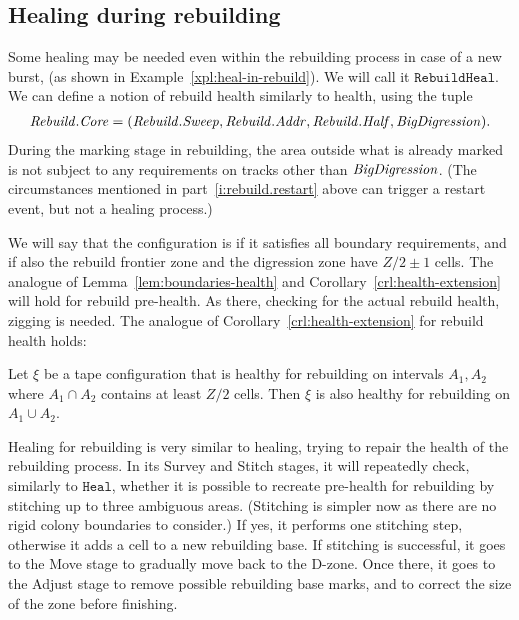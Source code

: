 \documentclass[11pt]{memoir}
\theoremstyle{definition} %
\newcommand{\fld}[1]{\ensuremath{\textit{#1\/}}}
\newcommand{\rul}[1]{\ensuremath{\texttt{#1}}}
\newcommand{\Z}{Z} %
\newcommand{\Addr}{\fld{Addr}}
\newcommand{\BigDigression}{\fld{BigDigression}}
\newcommand{\Core}{\fld{Core}}
\newcommand{\Half}{\fld{Half}} %
\newcommand{\Rebuild}{\fld{Rebuild}} %
\newcommand{\Sweep}{\fld{Sweep}} %
\newcommand{\rHeal}{\rul{Heal}}
\newcommand{\rRebuildHeal}{\rul{RebuildHeal}}
\begin{document}
\subsection{Healing during rebuilding}\label{sec:rebuild-heal}

Some healing may be needed even within the rebuilding process in case of a new burst,
(as shown in Example~\ref{xpl:heal-in-rebuild}).
We will call it \( \rRebuildHeal \).
We can define a notion of rebuild health similarly to health, using the tuple
\begin{align*}
 \Rebuild.\Core = (\Rebuild.\Sweep, \Rebuild.\Addr, \Rebuild.\Half,\BigDigression).
\end{align*}
During the marking stage in rebuilding, the area outside what is already marked is not subject
to any requirements on tracks other than \( \BigDigression \).
(The circumstances mentioned in part~\ref{i:rebuild.restart} above can trigger a restart event, but not
a healing process.)

We will say that the configuration is  if it
satisfies all boundary requirements, and 
if also the rebuild frontier zone and the digression zone have \( \Z/2\pm 1 \) cells.
The analogue of Lemma~\ref{lem:boundaries-health}
and Corollary~\ref{crl:health-extension} will hold for rebuild pre-health.
As there, checking for the actual rebuild health, zigging is needed.
The analogue of Corollary~\ref{crl:health-extension} for rebuild health holds:

\begin{lemma}\label{lem:rebuild-health-extension}
Let \( \xi \) be a tape configuration that is healthy for rebuilding on intervals \( A_{1}, A_{2} \) 
where \( A_{1}\cap A_{2} \) contains at least \( \Z/2 \) cells.
Then \( \xi \) is also healthy for rebuilding on \( A_{1}\cup A_{2} \).  
\end{lemma}

Healing for rebuilding is very similar to healing, trying to repair the health of the
rebuilding process.
In its Survey  and Stitch stages, it will repeatedly check, similarly to \( \rHeal \),
whether it is possible to recreate pre-health
for rebuilding by stitching up to three ambiguous areas.
(Stitching is simpler now as there are no rigid colony boundaries to consider.)
If yes, it performs one stitching step, otherwise it adds a cell to a new rebuilding base.
If stitching is successful, it goes to the Move stage to gradually move back to the D-zone.
Once there, it goes to the Adjust stage to remove possible rebuilding base marks,
and to correct the size of the zone before finishing.
\end{document}
